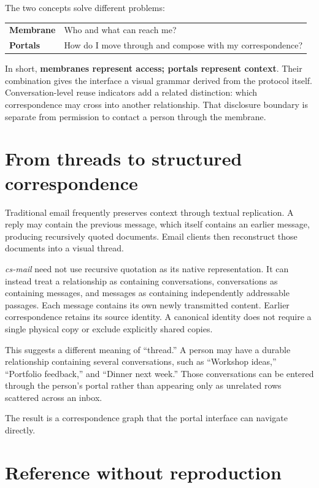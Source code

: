 \documentclass[11pt]{article}
\newcommand{\csmail}{\textit{cs-mail}}
\begin{document}
The two concepts solve different problems:

\begin{center}
\begin{tabular}{ll}
\toprule
\textbf{Membrane} & Who and what can reach me? \\
\textbf{Portals} & How do I move through and compose with my correspondence? \\
\bottomrule
\end{tabular}
\end{center}

In short, \textbf{membranes represent access; portals represent context}. Their combination gives the interface a visual grammar derived from the protocol itself. Conversation-level reuse indicators add a related distinction: which correspondence may cross into another relationship. That disclosure boundary is separate from permission to contact a person through the membrane.

\section{From threads to structured correspondence}

Traditional email frequently preserves context through textual replication. A reply may contain the previous message, which itself contains an earlier message, producing recursively quoted documents. Email clients then reconstruct those documents into a visual thread.

\csmail{} need not use recursive quotation as its native representation. It can instead treat a relationship as containing conversations, conversations as containing messages, and messages as containing independently addressable passages. Each message contains its own newly transmitted content. Earlier correspondence retains its source identity. A canonical identity does not require a single physical copy or exclude explicitly shared copies.

This suggests a different meaning of ``thread.'' A person may have a durable relationship containing several conversations, such as ``Workshop ideas,'' ``Portfolio feedback,'' and ``Dinner next week.'' Those conversations can be entered through the person's portal rather than appearing only as unrelated rows scattered across an inbox.

The result is a correspondence graph that the portal interface can navigate directly.

\section{Reference without reproduction}
\end{document}
